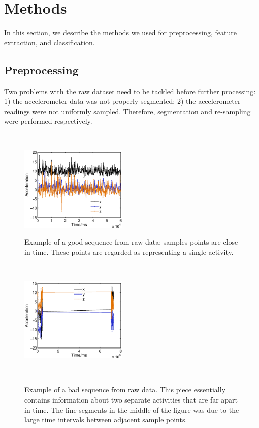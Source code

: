 \documentclass{article} %
\begin{document}
\section{Methods}
In this section, we describe the methods we used for preprocessing, feature extraction, and classification.

\subsection{Preprocessing}
Two problems with the raw dataset need to be tackled before further processing: 1) the accelerometer data was not properly segmented; 2) the accelerometer readings were not uniformly sampled. Therefore, segmentation and re-sampling were performed respectively.

\begin{figure}
    \hspace{-0.5cm}
    \begin{minipage}[t]{0.02\textwidth}~
    \end{minipage}
    \begin{minipage}[t]{0.47\textwidth}
    \centering
    \includegraphics[height=40mm]{fig/good_raw.eps}
    \caption{Example of a good sequence from raw data: samples points are close in time. These points are regarded as representing a single activity.}
    \label{fig:good_raw}
    \end{minipage}
    \begin{minipage}[t]{0.02\textwidth}~
    \end{minipage}
    \begin{minipage}[t]{0.47\textwidth}
    \centering
    \includegraphics[height=40mm]{fig/bad_raw.eps}\\
    \caption{Example of a bad sequence from raw data. This piece essentially contains information about two separate activities that are far apart in time. The line segments in the middle of the figure was due to the large time intervals between adjacent sample points.}
    \label{fig:bad_raw}
    \end{minipage}
    \begin{minipage}[t]{0.02\textwidth}~
    \end{minipage}%
 \end{figure}
\end{document}
